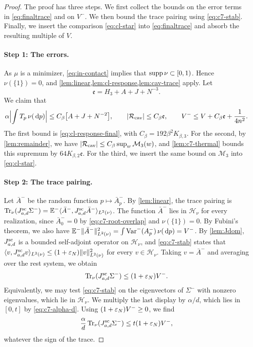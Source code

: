 \begin{proof}
The proof has three steps. We first collect the bounds on the error
terms in \eqref{eq:finaltrace} and on $V^-$. We then bound the trace
pairing using \eqref{eq:c7-stab}. Finally, we insert the comparison
\eqref{eq:cl-star} into \eqref{eq:finaltrace} and absorb the resulting
multiple of $V$.

\paragraph{Step 1: The errors.} As $\mu$ is a minimizer,
\eqref{eq:in-contact} implies that $\operatorname{supp}\nu\subset[0,1)$. Hence
$\nu(\{1\})=0$, and \cref{lem:linear,lem:cl-response,lem:cav-trace}
apply. Let
\[
 \mathfrak e=H_3+A+J+N^{-3}.
\]
We claim that
\begin{equation}\label{eq:c7-errors}
 \alpha\Bigl|\int T_p\,\nu(\,\mathrm d p)\Bigr|\le C_\beta\bigl[A+J+N^{-2}\bigr],
 \qquad
 |\mathcal R_{\rm cav}|\le C_\beta\mathfrak e,
 \qquad
 V^-\le V+C_\beta\mathfrak e+\frac1{4n^2}.
\end{equation}
The first bound is \eqref{eq:cl-response-final}, with
$C_\beta=192\beta^2K_{\beta,3}$. For the second, by \cref{lem:remainder}, we have
$|\mathcal R_{\rm cav}|\le C_\beta\sup_w\mathcal M_3(w)$, and
\cref{lem:c7-thermal} bounds this supremum by $64K_{\beta,2}\mathfrak e$.
For the third, we insert the same bound on $\mathcal M_3$ into
\eqref{eq:cl-star}.

\paragraph{Step 2: The trace pairing.} Let $\bar A^-$ be the random
function $p\mapsto\bar A^-_p$. By \cref{lem:linear}, the trace pairing is
$\operatorname{Tr}_\nu(J^{\mathrm{sc}}_{a,d}\Sigma^-)=\mathbb E^-\langle\bar A^-,J^{\mathrm{sc}}_{a,d}\bar
A^-\rangle_{L^2(\nu)}$. The function $\bar A^-$ lies in
$\mathcal H_\nu$ for every realization, since $\bar A^-_0=0$ by
\eqref{eq:c7-root-overlap} and $\nu(\{1\})=0$. By Fubini's theorem, we
also have
$\mathbb E^-\|\bar A^-\|^2_{L^2(\nu)}=\int\operatorname{Var}^-(A^-_p)\,\nu(\,\mathrm d p)=V^-$. By \cref{lem:Jdom}, $J^{\mathrm{sc}}_{a,d}$ is a
bounded self-adjoint operator on $\mathcal H_\nu$, and
\eqref{eq:c7-stab} states that
$\langle v,J^{\mathrm{sc}}_{a,d}v\rangle_{L^2(\nu)}\le(1+\varepsilon_N)\|v\|^2_{L^2(\nu)}$
for every $v\in\mathcal H_\nu$. Taking $v=\bar A^-$ and averaging over
the rest system, we obtain
\[
 \operatorname{Tr}_\nu(J^{\mathrm{sc}}_{a,d}\Sigma^-)\le(1+\varepsilon_N)V^-.
\]
Equivalently, we may test \eqref{eq:c7-stab} on the eigenvectors of
$\Sigma^-$ with nonzero eigenvalues, which lie in $\mathcal H_\nu$. We multiply the last display
by $\alpha/d$, which lies in $[0,t]$ by \eqref{eq:c7-alpha-d}. Using
$(1+\varepsilon_N)V^-\ge0$, we find
\begin{equation}\label{eq:c7-trace-bound}
 \frac\alpha d\operatorname{Tr}_\nu(J^{\mathrm{sc}}_{a,d}\Sigma^-)\le t(1+\varepsilon_N)V^-,
\end{equation}
whatever the sign of the trace.


\end{proof}
